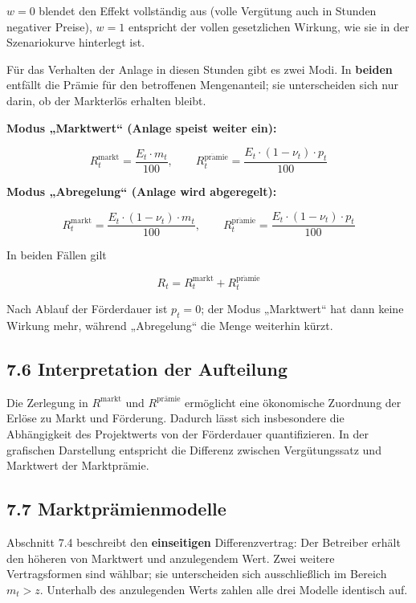 \documentclass[
  a4paper,
  10pt]{article}
\begin{document}
\(w = 0\) blendet den Effekt vollständig aus (volle Vergütung auch in
Stunden negativer Preise), \(w = 1\) entspricht der vollen gesetzlichen
Wirkung, wie sie in der Szenariokurve hinterlegt ist.

Für das Verhalten der Anlage in diesen Stunden gibt es zwei Modi. In
\textbf{beiden} entfällt die Prämie für den betroffenen Mengenanteil;
sie unterscheiden sich nur darin, ob der Markterlös erhalten bleibt.

\textbf{Modus „Marktwert`` (Anlage speist weiter ein):}

\[ R^{\mathrm{markt}}_t = \frac{E_t \cdot m_t}{100}, \qquad R^{\mathrm{pr\ddot{a}mie}}_t = \frac{E_t \cdot (1 - \nu_t) \cdot p_t}{100} \]

\textbf{Modus „Abregelung`` (Anlage wird abgeregelt):}

\[ R^{\mathrm{markt}}_t = \frac{E_t \cdot (1 - \nu_t) \cdot m_t}{100}, \qquad R^{\mathrm{pr\ddot{a}mie}}_t = \frac{E_t \cdot (1 - \nu_t) \cdot p_t}{100} \]

In beiden Fällen gilt

\[ R_t = R^{\mathrm{markt}}_t + R^{\mathrm{pr\ddot{a}mie}}_t \]

Nach Ablauf der Förderdauer ist \(p_t = 0\); der Modus „Marktwert`` hat
dann keine Wirkung mehr, während „Abregelung`` die Menge weiterhin
kürzt.

\hypertarget{interpretation-der-aufteilung}{%
\subsection{7.6 Interpretation der
Aufteilung}\label{interpretation-der-aufteilung}}

Die Zerlegung in \(R^{\mathrm{markt}}\) und \(R^{\mathrm{prämie}}\)
ermöglicht eine ökonomische Zuordnung der Erlöse zu Markt und Förderung.
Dadurch lässt sich insbesondere die Abhängigkeit des Projektwerts von
der Förderdauer quantifizieren. In der grafischen Darstellung entspricht
die Differenz zwischen Vergütungssatz und Marktwert der Marktprämie.

\hypertarget{marktpruxe4mienmodelle}{%
\subsection{7.7 Marktprämienmodelle}\label{marktpruxe4mienmodelle}}

Abschnitt 7.4 beschreibt den \textbf{einseitigen} Differenzvertrag: Der
Betreiber erhält den höheren von Marktwert und anzulegendem Wert. Zwei
weitere Vertragsformen sind wählbar; sie unterscheiden sich
ausschließlich im Bereich \(m_t > z\). Unterhalb des anzulegenden Werts
zahlen alle drei Modelle identisch auf.
\end{document}
